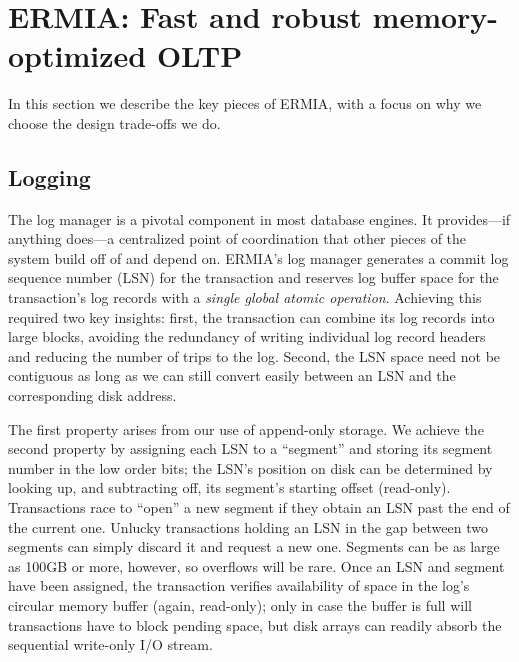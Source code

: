 
\section{ERMIA: Fast and robust memory-optimized OLTP}

In this section we describe the key pieces of ERMIA, with a focus on why we choose the design trade-offs we do.

\subsection{Logging}
The log manager is a pivotal component in most database engines. It provides---if anything does---a centralized point of coordination that other pieces of the system build off of and depend on. ERMIA's log manager generates a commit log sequence number (LSN) for the transaction and reserves log buffer space for the transaction's log records with a \textit{single global atomic operation}. Achieving this required two key insights: first, the transaction can combine its log records into large blocks, avoiding the redundancy of writing individual log record headers and reducing the number of trips to the log. Second, the LSN space need not be contiguous as long as we can still convert easily between an LSN and the corresponding disk address.

The first property arises from our use of append-only storage. We achieve the second property by assigning each LSN to a ``segment'' and storing its segment number in the low order bits; the LSN's position on disk can be determined by looking up, and subtracting off, its segment's starting offset (read-only). Transactions race to ``open'' a new segment if they obtain an LSN past the end of the current one. Unlucky transactions holding an LSN in the gap between two segments can simply discard it and request a new one. Segments can be as large as 100GB or more, however, so overflows will be rare. Once an LSN and segment have been assigned, the transaction verifies availability of space in the log's circular memory buffer (again, read-only); only in case the buffer is full will transactions have to block pending space, but disk arrays can readily absorb the sequential write-only I/O stream.

